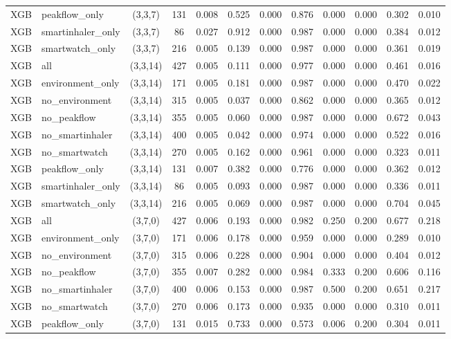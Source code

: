 \begin{longtable}{llcccccccccc}
XGB & peakflow\_only & (3,3,7) & 131 & 0.008 & 0.525 & 0.000 & 0.876 & 0.000 & 0.000 & 0.302 & 0.010 \\
XGB & smartinhaler\_only & (3,3,7) & 86 & 0.027 & 0.912 & 0.000 & 0.987 & 0.000 & 0.000 & 0.384 & 0.012 \\
XGB & smartwatch\_only & (3,3,7) & 216 & 0.005 & 0.139 & 0.000 & 0.987 & 0.000 & 0.000 & 0.361 & 0.019 \\
XGB & all & (3,3,14) & 427 & 0.005 & 0.111 & 0.000 & 0.977 & 0.000 & 0.000 & 0.461 & 0.016 \\
XGB & environment\_only & (3,3,14) & 171 & 0.005 & 0.181 & 0.000 & 0.987 & 0.000 & 0.000 & 0.470 & 0.022 \\
XGB & no\_environment & (3,3,14) & 315 & 0.005 & 0.037 & 0.000 & 0.862 & 0.000 & 0.000 & 0.365 & 0.012 \\
XGB & no\_peakflow & (3,3,14) & 355 & 0.005 & 0.060 & 0.000 & 0.987 & 0.000 & 0.000 & 0.672 & 0.043 \\
XGB & no\_smartinhaler & (3,3,14) & 400 & 0.005 & 0.042 & 0.000 & 0.974 & 0.000 & 0.000 & 0.522 & 0.016 \\
XGB & no\_smartwatch & (3,3,14) & 270 & 0.005 & 0.162 & 0.000 & 0.961 & 0.000 & 0.000 & 0.323 & 0.011 \\
XGB & peakflow\_only & (3,3,14) & 131 & 0.007 & 0.382 & 0.000 & 0.776 & 0.000 & 0.000 & 0.362 & 0.012 \\
XGB & smartinhaler\_only & (3,3,14) & 86 & 0.005 & 0.093 & 0.000 & 0.987 & 0.000 & 0.000 & 0.336 & 0.011 \\
XGB & smartwatch\_only & (3,3,14) & 216 & 0.005 & 0.069 & 0.000 & 0.987 & 0.000 & 0.000 & 0.704 & 0.045 \\
XGB & all & (3,7,0) & 427 & 0.006 & 0.193 & 0.000 & 0.982 & 0.250 & 0.200 & 0.677 & 0.218 \\
XGB & environment\_only & (3,7,0) & 171 & 0.006 & 0.178 & 0.000 & 0.959 & 0.000 & 0.000 & 0.289 & 0.010 \\
XGB & no\_environment & (3,7,0) & 315 & 0.006 & 0.228 & 0.000 & 0.904 & 0.000 & 0.000 & 0.404 & 0.012 \\
XGB & no\_peakflow & (3,7,0) & 355 & 0.007 & 0.282 & 0.000 & 0.984 & 0.333 & 0.200 & 0.606 & 0.116 \\
XGB & no\_smartinhaler & (3,7,0) & 400 & 0.006 & 0.153 & 0.000 & 0.987 & 0.500 & 0.200 & 0.651 & 0.217 \\
XGB & no\_smartwatch & (3,7,0) & 270 & 0.006 & 0.173 & 0.000 & 0.935 & 0.000 & 0.000 & 0.310 & 0.011 \\
XGB & peakflow\_only & (3,7,0) & 131 & 0.015 & 0.733 & 0.000 & 0.573 & 0.006 & 0.200 & 0.304 & 0.011 \\

\end{longtable}
